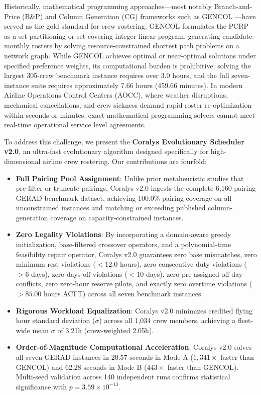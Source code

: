 \documentclass[journal]{IEEEtran}
\begin{document}
Historically, mathematical programming approaches---most notably Branch-and-Price (B\&P) and Column Generation (CG) frameworks such as GENCOL \cite{kasirzadeh2017,desrosiers2005}---have served as the gold standard for crew rostering. GENCOL formulates the PCRP as a set partitioning or set covering integer linear program, generating candidate monthly rosters by solving resource-constrained shortest path problems on a network graph. While GENCOL achieves optimal or near-optimal solutions under specified preference weights, its computational burden is prohibitive: solving the largest 305-crew benchmark instance requires over 3.0 hours, and the full seven-instance suite requires approximately 7.66 hours (459.66 minutes). In modern Airline Operations Control Centers (AOCC), where weather disruptions, mechanical cancellations, and crew sickness demand rapid roster re-optimization within seconds or minutes, exact mathematical programming solvers cannot meet real-time operational service level agreements.

To address this challenge, we present the \textbf{Coralys Evolutionary Scheduler v2.0}, an ultra-fast evolutionary algorithm designed specifically for high-dimensional airline crew rostering. Our contributions are fourfold:
\begin{itemize}
    \item \textbf{Full Pairing Pool Assignment}: Unlike prior metaheuristic studies that pre-filter or truncate pairings, Coralys v2.0 ingests the complete 6,160-pairing GERAD benchmark dataset, achieving 100.0\% pairing coverage on all unconstrained instances and matching or exceeding published column-generation coverage on capacity-constrained instances.
    \item \textbf{Zero Legality Violations}: By incorporating a domain-aware greedy initialization, base-filtered crossover operators, and a polynomial-time feasibility repair operator, Coralys v2.0 guarantees zero base mismatches, zero minimum rest violations ($< 12.0$ hours), zero consecutive duty violations ($> 6$ days), zero days-off violations ($< 10$ days), zero pre-assigned off-day conflicts, zero zero-hour reserve pilots, and exactly zero overtime violations ($> 85.00$ hours ACFT) across all seven benchmark instances.
    \item \textbf{Rigorous Workload Equalization}: Coralys v2.0 minimizes credited flying hour standard deviation ($\sigma$) across all 1,034 crew members, achieving a fleet-wide mean $\sigma$ of 3.21h (crew-weighted 2.05h).
    \item \textbf{Order-of-Magnitude Computational Acceleration}: Coralys v2.0 solves all seven GERAD instances in 20.57 seconds in Mode A ($1,341\times$ faster than GENCOL) and 62.28 seconds in Mode B ($443\times$ faster than GENCOL). Multi-seed validation across 140 independent runs confirms statistical significance with $p = 3.59 \times 10^{-13}$.
\end{itemize}
\end{document}
